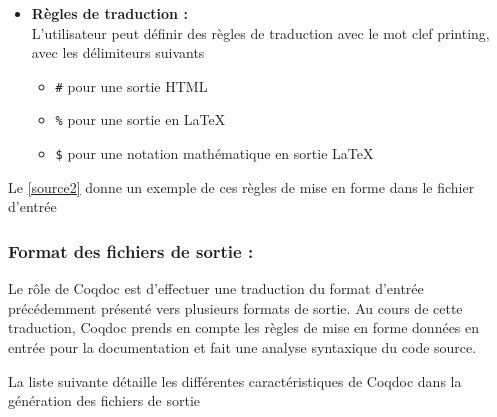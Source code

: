 \documentclass[a4paper, 11pt]{report}
\begin{document}
\begin{itemize}
        (ou afficher) des portions de code avec les délimitant avec
        \texttt{(* begin hide *)} et \texttt{(* end hide *)}
        (pour forcer l'affichage, il suffit de remplacer \texttt{hide} par \texttt{show})
      \item[] \textbf{Règles de traduction :} \\
        L'utilisateur peut définir des règles de traduction avec le mot clef
        printing, avec les délimiteurs suivants
        \begin{itemize}
          \item \texttt{\#} pour une sortie HTML
          \item \texttt{\%} pour une sortie en LaTeX
          \item \texttt{\$} pour une notation mathématique en sortie LaTeX
        \end{itemize}
    \end{itemize}
    Le \cref{source2} donne un exemple de ces règles de mise en forme
    dans le fichier d'entrée
    

    \subsubsection{Format des fichiers de sortie :}
    Le rôle de Coqdoc est d'effectuer une traduction du format d'entrée
    précédemment présenté vers plusieurs formats de sortie. Au cours
    de cette traduction, Coqdoc prends en compte les règles de mise en forme
    données en entrée pour la documentation et fait une analyse syntaxique du
    code source.

    La liste suivante détaille les différentes caractéristiques de Coqdoc dans
    la génération des fichiers de sortie
\end{document}
